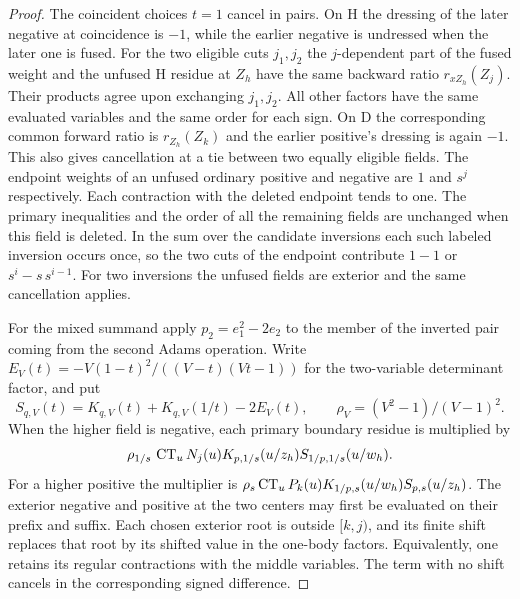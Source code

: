 \begin{proof}
The coincident choices $t=1$ cancel in pairs. On H the dressing of the
later negative at coincidence is $-1$, while the earlier negative is
undressed when the later one is fused. For the two eligible cuts $j_1,j_2$
the $j$-dependent part of the fused weight and the unfused H residue at
$Z_h$ have the same backward ratio $r_{x Z_h}(Z_j)$. Their products
agree upon exchanging $j_1,j_2$. All other factors have the same
evaluated variables and the same order for each sign. On D the
corresponding common forward ratio is $r_{Z_h}(Z_k)$ and the earlier
positive's dressing is again $-1$. This also gives cancellation at a
tie between two equally eligible fields. The endpoint weights of an
unfused ordinary positive and negative are $1$ and $s^j$ respectively.
Each contraction with the deleted endpoint tends to one. The primary
inequalities and the order of all the remaining fields are unchanged
when this field is deleted. In the sum over the candidate inversions
each such labeled inversion occurs once, so the two cuts of the
endpoint contribute $1-1$ or $s^i-s\,s^{i-1}$. For two inversions
the unfused fields are exterior and the same cancellation applies.

For the mixed summand apply $p_2=e_1^2-2e_2$ to the member of
the inverted pair coming from the second Adams operation.
Write $E_V(t)=-V(1-t)^2/((V-t)(Vt-1))$ for the two-variable
determinant factor, and put
\[
 S_{q,V}(t)=K_{q,V}(t)+K_{q,V}(1/t)-2E_V(t),\qquad
 \rho_V=(V^2-1)/(V-1)^2 .
\]
When the higher field is negative, each primary boundary residue is
multiplied by
\begin{equation}\label{eq:cubic-mixed}
 \rho_{1/s}\,\operatorname{CT}_u N_j(u)
 K_{p,1/s}(u/z_h)S_{1/p,1/s}(u/w_h).
\end{equation}
For a higher positive the multiplier is
$\rho_s\operatorname{CT}_u P_k(u)K_{1/p,s}(u/w_h)S_{p,s}(u/z_h)$.
The exterior negative and positive at the two centers may first be
evaluated on their prefix and suffix. Each chosen exterior root is
outside $[k,j)$, and its finite shift replaces that root by its
shifted value in the one-body factors. Equivalently, one retains
its regular contractions with the middle variables. The term with
no shift cancels in the corresponding signed difference.


\end{proof}
